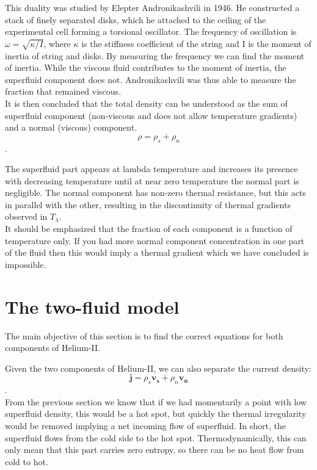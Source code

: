 \documentclass{article}
\begin{document}
This duality was studied by Elepter Andronikashvili in 1946. He constructed a stack of finely separated disks, which he attached to the ceiling of the experimental cell forming a torsional oscillator. The frequency of oscillation is $\omega = \sqrt{\kappa/I}$, where $\kappa$ is the stiffness coefficient of the string and I is the moment of inertia of string and disks. By measuring the frequency we can find the moment of inertia. While the viscous fluid contributes to the moment of inertia, the superfluid component does not. Andronikashvili was thus able to measure the fraction that remained viscous.
\\

It is then concluded that the total density can be understood as the sum of superfluid component (non-viscous and does not allow temperature gradients) and a normal (viscous) component.
\\

\[\rho = \rho_s + \rho_n\].

The superfluid part appears at lambda temperature and increases its presence with decreasing temperature until at near zero temperature the normal part is negligible. The normal component has non-zero thermal resistance, but this acts in parallel with the other, resulting in the discontinuity of thermal gradients observed in $T_\lambda$.
\\

It should be emphasized that the fraction of each component is a function of temperature only. If you had more normal component concentration in one part of the fluid then this would imply a thermal gradient which we have concluded is impossible.
\\

\section{The two-fluid model}


The main objective of this section is to find the correct equations for both components of Helium-II.

Given the two components of Helium-II, we can also separate the current density:
\[\mathbf{j} = \rho_s \mathbf{v_s}+\rho_n \mathbf{v_n}\].
\\

From the previous section we know that if we had momentarily a point with low superfluid density, this would be a hot spot, but quickly the thermal irregularity would be removed implying a net incoming flow of superfluid. In short, the superfluid flows from the cold side to the hot spot. Thermodynamically, this can only mean that this part carries zero entropy, so there can be no heat flow from cold to hot.
\\
\end{document}
